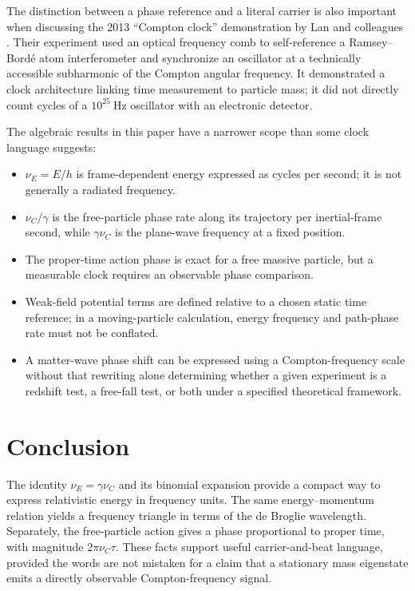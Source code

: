 \documentclass[12pt]{article}
\begin{document}
The distinction between a phase reference and a literal carrier is also important when discussing the 2013 ``Compton clock'' demonstration by Lan and colleagues \cite{Lan}. Their experiment used an optical frequency comb to self-reference a Ramsey--Bord\'e atom interferometer and synchronize an oscillator at a technically accessible subharmonic of the Compton angular frequency. It demonstrated a clock architecture linking time measurement to particle mass; it did not directly count cycles of a $10^{25}\ \mathrm{Hz}$ oscillator with an electronic detector.

The algebraic results in this paper have a narrower scope than some clock language suggests:
\begin{itemize}
  \item $\nu_E=E/h$ is frame-dependent energy expressed as cycles per second; it is not generally a radiated frequency.
  \item $\nu_C/\gamma$ is the free-particle phase rate along its trajectory per inertial-frame second, while $\gamma\nu_C$ is the plane-wave frequency at a fixed position.
  \item The proper-time action phase is exact for a free massive particle, but a measurable clock requires an observable phase comparison.
  \item Weak-field potential terms are defined relative to a chosen static time reference; in a moving-particle calculation, energy frequency and path-phase rate must not be conflated.
  \item A matter-wave phase shift can be expressed using a Compton-frequency scale without that rewriting alone determining whether a given experiment is a redshift test, a free-fall test, or both under a specified theoretical framework.
\end{itemize}

\section{Conclusion}

The identity $\nu_E=\gamma\nu_C$ and its binomial expansion provide a compact way to express relativistic energy in frequency units. The same energy--momentum relation yields a frequency triangle in terms of the de Broglie wavelength. Separately, the free-particle action gives a phase proportional to proper time, with magnitude $2\pi\nu_C\tau$. These facts support useful carrier-and-beat language, provided the words are not mistaken for a claim that a stationary mass eigenstate emits a directly observable Compton-frequency signal.
\end{document}
